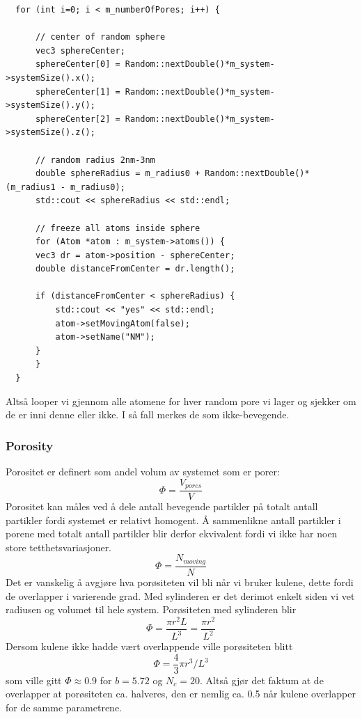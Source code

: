 \documentclass[english, a4paper]{article}
\begin{document}
\begin{lstlisting}
  for (int i=0; i < m_numberOfPores; i++) {

      // center of random sphere
      vec3 sphereCenter;
      sphereCenter[0] = Random::nextDouble()*m_system->systemSize().x();
      sphereCenter[1] = Random::nextDouble()*m_system->systemSize().y();
      sphereCenter[2] = Random::nextDouble()*m_system->systemSize().z();

      // random radius 2nm-3nm
      double sphereRadius = m_radius0 + Random::nextDouble()*(m_radius1 - m_radius0);
      std::cout << sphereRadius << std::endl;

      // freeze all atoms inside sphere
      for (Atom *atom : m_system->atoms()) {
	  vec3 dr = atom->position - sphereCenter;
	  double distanceFromCenter = dr.length();

	  if (distanceFromCenter < sphereRadius) {
	      std::cout << "yes" << std::endl;
	      atom->setMovingAtom(false);
	      atom->setName("NM");
	  }
      }
  }
\end{lstlisting}
Altså looper vi gjennom alle atomene for hver random pore vi lager og sjekker om de er inni denne eller ikke. 
I så fall merkes de som ikke-bevegende. 

\subsubsection{Porosity}
Porositet er definert som andel volum av systemet som er porer:
\begin{equation}
 \Phi = \frac{V_{pores}}{V}
\end{equation}
Porositet kan måles ved å dele antall bevegende partikler på totalt antall partikler fordi
systemet er relativt homogent. Å sammenlikne antall partikler i porene med totalt antall
partikler blir derfor ekvivalent fordi vi ikke har noen store tetthetsvariasjoner.
\begin{equation}
 \Phi = \frac{N_{moving}}{N}
\end{equation}
Det er vanskelig å avgjøre hva porøsiteten vil bli når vi bruker kulene, dette fordi de overlapper
i varierende grad. Med sylinderen er det derimot enkelt siden vi vet radiusen og volumet til hele
system. Porøsiteten med sylinderen blir
\begin{equation}
 \Phi = \frac{\pi r^2 L}{L^3} = \frac{\pi r^2}{L^2}
\end{equation}
Dersom kulene ikke hadde vært overlappende ville porøsiteten blitt
\begin{equation}
 \Phi = \frac{4}{3}\pi r^3 / L^3
\end{equation}
som ville gitt $\Phi \approx 0.9$ for $b=5.72$ og $N_c = 20$. Altså gjør det faktum at de overlapper
at porøsiteten ca. halveres, den er nemlig ca. 0.5 når kulene overlapper for de samme parametrene.
\end{document}
